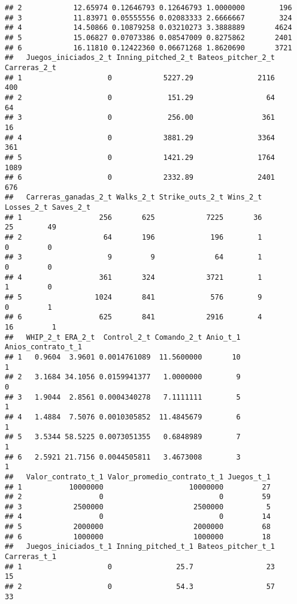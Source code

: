 \documentclass[
]{article}
\begin{document}
\begin{verbatim}
## 2            12.65974 0.12646793 0.12646793 1.0000000        196
## 3            11.83971 0.05555556 0.02083333 2.6666667        324
## 4            14.50866 0.10879258 0.03210273 3.3888889       4624
## 5            15.06827 0.07073386 0.08547009 0.8275862       2401
## 6            16.11810 0.12422360 0.06671268 1.8620690       3721
##   Juegos_iniciados_2_t Inning_pitched_2_t Bateos_pitcher_2_t Carreras_2_t
## 1                    0            5227.29               2116          400
## 2                    0             151.29                 64           64
## 3                    0             256.00                361           16
## 4                    0            3881.29               3364          361
## 5                    0            1421.29               1764         1089
## 6                    0            2332.89               2401          676
##   Carreras_ganadas_2_t Walks_2_t Strike_outs_2_t Wins_2_t Losses_2_t Saves_2_t
## 1                  256       625            7225       36         25        49
## 2                   64       196             196        1          0         0
## 3                    9         9              64        1          0         0
## 4                  361       324            3721        1          1         0
## 5                 1024       841             576        9          0         1
## 6                  625       841            2916        4         16         1
##   WHIP_2_t ERA_2_t  Control_2_t Comando_2_t Anio_t_1 Anios_contrato_t_1
## 1   0.9604  3.9601 0.0014761089  11.5600000       10                  1
## 2   3.1684 34.1056 0.0159941377   1.0000000        9                  0
## 3   1.9044  2.8561 0.0004340278   7.1111111        5                  1
## 4   1.4884  7.5076 0.0010305852  11.4845679        6                  1
## 5   3.5344 58.5225 0.0073051355   0.6848989        7                  1
## 6   2.5921 21.7156 0.0044505811   3.4673008        3                  1
##   Valor_contrato_t_1 Valor_promedio_contrato_t_1 Juegos_t_1
## 1           10000000                    10000000         27
## 2                  0                           0         59
## 3            2500000                     2500000          5
## 4                  0                           0         14
## 5            2000000                     2000000         68
## 6            1000000                     1000000         18
##   Juegos_iniciados_t_1 Inning_pitched_t_1 Bateos_pitcher_t_1 Carreras_t_1
## 1                    0               25.7                 23           15
## 2                    0               54.3                 57           33

\end{verbatim}
\end{document}
